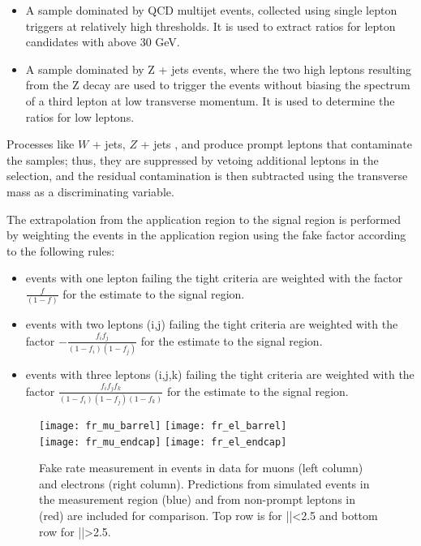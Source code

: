 \begin{itemize}
\item A sample dominated by QCD multijet events, collected using single lepton triggers at relatively high \pt thresholds. It is used to extract ratios for lepton candidates with \pt above 30 GeV.
\item A sample dominated by Z + jets events, where the two high \pt leptons resulting from the Z decay are used to trigger the events without biasing the \pt spectrum of a third lepton at low transverse momentum. It is used to determine the ratios for low \pt leptons. 
\end{itemize}

Processes like $W$ + jets, $Z$ + jets , \WZ and \ZZ produce prompt leptons that contaminate the samples; thus, they are suppressed by vetoing additional leptons in the selection, and the residual contamination is then subtracted using the transverse mass as a discriminating variable.

The extrapolation from the application region to the signal region is performed by weighting the events in the application region using the fake factor according to the following rules:

\begin{itemize}
\item events with one lepton failing the tight criteria are weighted with the factor $\frac{f}{(1-f)}$ for the estimate to the signal region. 
\item events with two leptons (i,j) failing the tight criteria are weighted with the factor $-\frac{f_if_j}{(1-f_i)(1-f_j)}$ for the estimate to the signal region. 
\item events with three leptons (i,j,k) failing the tight criteria are weighted with the factor $\frac{f_if_jf_k}{(1-f_i)(1-f_j)(1-f_k)}$ for the estimate to the signal region. 
\end{itemize}

\begin{figure}[htb]
\centering
        \texttt{[image: fr\_mu\_barrel]}
        \texttt{[image: fr\_el\_barrel]} \\
        \texttt{[image: fr\_mu\_endcap]}
        \texttt{[image: fr\_el\_endcap]}
\caption[Fake rates]{Fake rate measurement in events in data for muons (left column) and electrons (right column). Predictions from simulated events in the measurement region (blue) and from non-prompt leptons in \ttbar (red) are included for comparison. Top row is for |\etac|<2.5 and bottom row for |\etac|>2.5.}
\label{fig:frmeas-comb-data}
\end{figure}

